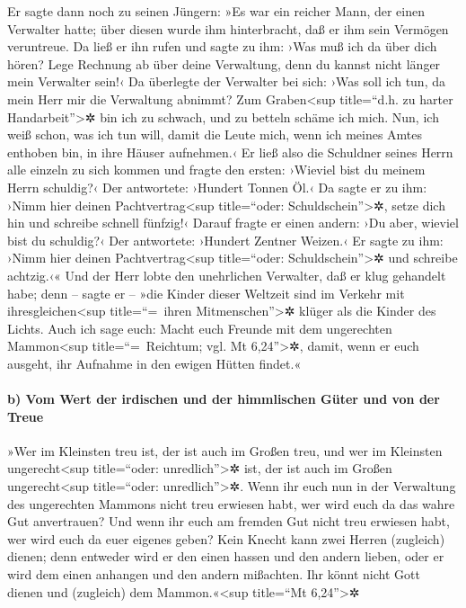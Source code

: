  Er sagte dann noch zu seinen Jüngern: »Es war ein reicher
Mann, der einen Verwalter hatte; über diesen wurde ihm hinterbracht, daß
er ihm sein Vermögen veruntreue.  Da ließ er ihn rufen und
sagte zu ihm: ›Was muß ich da über dich hören? Lege Rechnung ab über
deine Verwaltung, denn du kannst nicht länger mein Verwalter sein!‹
 Da überlegte der Verwalter bei sich: ›Was soll ich tun,
da mein Herr mir die Verwaltung abnimmt? Zum Graben\textless sup
title=``d.h. zu harter Handarbeit''\textgreater✲ bin ich zu schwach, und
zu betteln schäme ich mich.  Nun, ich weiß schon, was ich
tun will, damit die Leute mich, wenn ich meines Amtes enthoben bin, in
ihre Häuser aufnehmen.‹  Er ließ also die Schuldner seines
Herrn alle einzeln zu sich kommen und fragte den ersten: ›Wieviel bist
du meinem Herrn schuldig?‹  Der antwortete: ›Hundert
Tonnen Öl.‹ Da sagte er zu ihm: ›Nimm hier deinen
Pachtvertrag\textless sup title=``oder: Schuldschein''\textgreater✲,
setze dich hin und schreibe schnell fünfzig!‹  Darauf
fragte er einen andern: ›Du aber, wieviel bist du schuldig?‹ Der
antwortete: ›Hundert Zentner Weizen.‹ Er sagte zu ihm: ›Nimm hier deinen
Pachtvertrag\textless sup title=``oder: Schuldschein''\textgreater✲ und
schreibe achtzig.‹«  Und der Herr lobte den unehrlichen
Verwalter, daß er klug gehandelt habe; denn -- sagte er -- »die Kinder
dieser Weltzeit sind im Verkehr mit ihresgleichen\textless sup
title=``=~ihren Mitmenschen''\textgreater✲ klüger als die Kinder des
Lichts.  Auch ich sage euch: Macht euch Freunde mit dem
ungerechten Mammon\textless sup title=``=~Reichtum; vgl. Mt
6,24''\textgreater✲, damit, wenn er euch ausgeht, ihr Aufnahme in den
ewigen Hütten findet.«

\hypertarget{b-vom-wert-der-irdischen-und-der-himmlischen-guxfcter-und-von-der-treue}{%
\paragraph{b) Vom Wert der irdischen und der himmlischen Güter und von
der
Treue}\label{b-vom-wert-der-irdischen-und-der-himmlischen-guxfcter-und-von-der-treue}}

 »Wer im Kleinsten treu ist, der ist auch im Großen treu,
und wer im Kleinsten ungerecht\textless sup title=``oder:
unredlich''\textgreater✲ ist, der ist auch im Großen
ungerecht\textless sup title=``oder: unredlich''\textgreater✲.
 Wenn ihr euch nun in der Verwaltung des ungerechten
Mammons nicht treu erwiesen habt, wer wird euch da das wahre Gut
anvertrauen?  Und wenn ihr euch am fremden Gut nicht treu
erwiesen habt, wer wird euch da euer eigenes geben?  Kein
Knecht kann zwei Herren (zugleich) dienen; denn entweder wird er den
einen hassen und den andern lieben, oder er wird dem einen anhangen und
den andern mißachten. Ihr könnt nicht Gott dienen und (zugleich) dem
Mammon.«\textless sup title=``Mt 6,24''\textgreater✲

